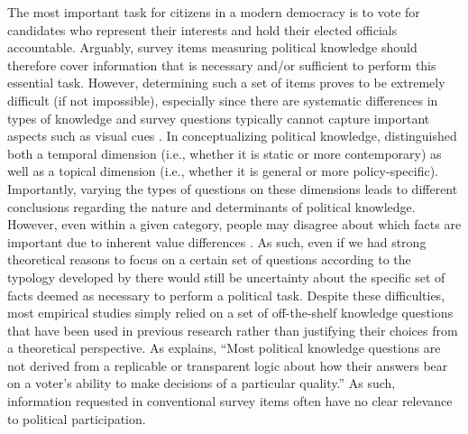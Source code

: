 \documentclass[12pt]{article}
\begin{document}
The most important task for citizens in a modern democracy is to vote for candidates who represent their interests and hold their elected officials accountable. Arguably, survey items measuring political knowledge should therefore cover information that is necessary and/or sufficient to perform this essential task. However, determining such a set of items proves to be extremely difficult (if not impossible), especially since there are systematic differences in types of knowledge \citep{barabas2014question} and survey questions typically cannot capture important aspects such as visual cues \citep{prior2014visual}. In conceptualizing political knowledge, \citet{barabas2014question} distinguished both a temporal dimension (i.e., whether it is static or more contemporary) as well as a topical dimension (i.e., whether it is general or more policy-specific). Importantly, varying the types of questions on these dimensions leads to different conclusions regarding the nature and determinants of political knowledge. However, even within a given category, people may disagree about which facts are important due to inherent value differences \citep[c.f.,][]{lupia2015uninformed}. As such, even if we had strong theoretical reasons to focus on a certain set of questions according to the typology developed by \citet{barabas2014question} there would still be uncertainty about the specific set of facts deemed as necessary to perform a political task. Despite these difficulties, most empirical studies simply relied on a set of off-the-shelf knowledge questions that have been used in previous research rather than justifying their choices from a theoretical perspective. As \citet[219]{lupia2006elitism} explains, ``Most political knowledge questions are not derived from a replicable or transparent logic about how their answers bear on a voter's ability to make decisions of a particular quality.'' As such, information requested in conventional survey items often have no clear relevance to political participation. 
\end{document}
